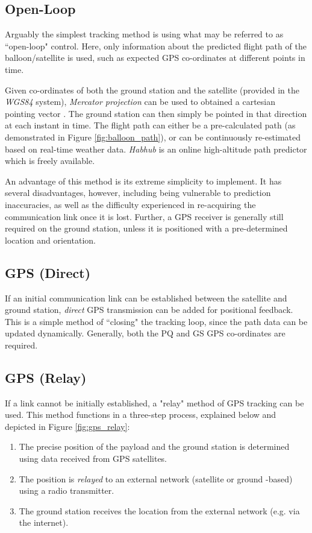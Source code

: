\subsection{Open-Loop}
Arguably the simplest tracking method is using what may be referred to as ``open-loop" control. Here, only information about the predicted flight path of the balloon/satellite is used, such as expected GPS co-ordinates at different points in time.

Given co-ordinates of both the ground station and the satellite (provided in the \textit{WGS84} system), \textit{Mercator projection} can be used to obtained a cartesian pointing vector \cite{site-mercator}. The ground station can then simply be pointed in that direction at each instant in time. The flight path can either be a pre-calculated path (as demonstrated in Figure \ref{fig:balloon_path}), or can be continuously re-estimated based on real-time weather data. \textit{Habhub} is an online high-altitude path predictor \cite{site-stratoballooningPredictionTracking} which is freely available.

An advantage of this method is its extreme simplicity to implement. It has several disadvantages, however, including being vulnerable to prediction inaccuracies, as well as the difficulty experienced in re-acquiring the communication link once it is lost. Further, a GPS receiver is generally still required on the ground station, unless it is positioned with a pre-determined location and orientation.

\subsection{GPS (Direct)}
If an initial communication link can be established between the satellite and ground station, \textit{direct} GPS transmission can be added for positional feedback. This is a simple method of ``closing" the tracking loop, since the path data can be updated dynamically. Generally, both the PQ and GS GPS co-ordinates are required.

\subsection{GPS (Relay)}
If a link cannot be initially established, a "relay" method of GPS tracking can be used. This method functions in a three-step process, explained below and depicted in Figure \ref{fig:gps_relay}:
\begin{enumerate}
    \item The precise position of the payload and the ground station is determined using data received from GPS satellites.
    \item The position is \textit{relayed} to an external network (satellite or ground -based) using a radio transmitter.
    \item The ground station receives the location from the external network (e.g. via the internet).
\end{enumerate}

